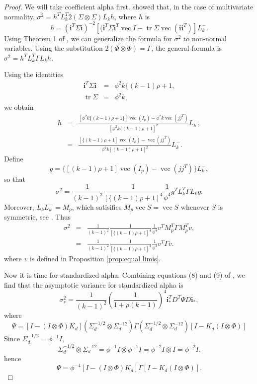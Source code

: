 \documentclass[twoside]{article}
\DeclareMathOperator{\tr}{tr}
\DeclareMathOperator{\vvec}{vec}
\begin{document}
\begin{proof}
We will take coefficient alpha first. \citet{Van_Zyl2000-si} showed that, in the case
of multivariate normality, $\sigma^{2}=h^{T}L_{k}^{T}2(\Sigma\otimes\Sigma)L_{k}h$,
where $h$ is \citep[eq. 19]{Van_Zyl2000-si}
\begin{equation*}
h = (\mathbf{i}^{T}\Sigma\mathbf{i})^{-2}[(\mathbf{i}^{T}\Sigma\mathbf{i}^{T}\vvec I-\tr\Sigma\vvec(\mathbf{i}\mathbf{i}^{T})]L_{k}^{-}.
\end{equation*}
Using Theorem 1 of \citet{Neudecker1990-ph}, we can generalize the formula for $\sigma^2$ to non-normal variables. Using the substitution
$2(\Phi\otimes\Phi)=\Gamma$, the general formula is $\sigma^{2}=h^{T}L_{k}^{T}\Gamma L_{k}h.$

Using the identities
\begin{eqnarray*}
\mathbf{i}^{T}\Sigma\mathbf{i} & = & \phi^{2}k\{(k-1)\rho+1,\\
\tr\Sigma & = & \phi^{2}k,
\end{eqnarray*}
we obtain
\begin{eqnarray*}
h & = & \frac{[\phi^{2}k\{(k-1)\rho+1\}]\vvec(I_{p})-\phi^{2}k\vvec(jj^{T})}{[\phi^{2}k\{(k-1)\rho+1]^{2}}L_{k}^{-},\\
 & = & \frac{[\{(k-1)\rho+1]\vvec(I_{p})-\vvec(jj^{T})}{\phi^{2}k[(k-1)\rho+1]^{2}}L_{k}^{-}.
\end{eqnarray*}
Define
\[
g=\{[(k-1)\rho+1]\vvec(I_{p})-\vvec(jj^{T})\}L_{k}^{-},
\]
so that
\[
\sigma^{2}=\frac{1}{(k-1)^{2}}\frac{1}{[\{(k-1)\rho+1]^{4}}\frac{1}{\phi^{4}}g^{T}L_{k}^{T}\Gamma L_{k}g.
\]
Moreover, $L_{k}L_{k}^{-}=M_{p}$, which satisifies $M_{p}\vvec S=\vvec S$
whenever $S$ is symmetric, see \citet[p. 275]{Van_Zyl2000-si}. Thus 
\begin{eqnarray*}
\sigma^{2} & = & \frac{1}{(k-1)^{2}}\frac{1}{[\{(k-1)\rho+1]^{4}}\frac{1}{\phi^{4}}v^{T}M_{p}^{T}\Gamma M_{p}^{T}v,\\
 & = & \frac{1}{(k-1)^{2}}\frac{1}{[\{(k-1)\rho+1]^{4}}\frac{1}{\phi^{4}}v^{T}\Gamma v.
\end{eqnarray*} where $v$ is defined in Proposition \ref{prop:equal limis}.

Now it is time for standardized alpha. Combining equations (8) and (9) of \citet{hayashi2005note},
we find that the asymptotic variance for standardized alpha is
\begin{equation*}
\sigma_{s}^{2}=\frac{1}{(k-1)^{2}}\left(\frac{1}{1+\rho(k-1)}\right)^{4}\mathbf{i}_{*}^{T}D^{T}\Psi D\mathbf{i}_{*},\label{eq:standardized alpha variance 3}
\end{equation*}
where 
\[
\Psi=[I-(I\otimes\Phi)K_{d}](\Sigma_{d}^{-1/2}\otimes\Sigma_{d}^{-12})\Gamma(\Sigma_{d}^{-1/2}\otimes\Sigma_{d}^{-12})[I-K_{d}(I\otimes\Phi)]
\]
Since $\Sigma_{d}^{-1/2}=\phi^{-1}I$,
\[
\Sigma_{d}^{-1/2}\otimes\Sigma_{d}^{-12}=\phi^{-1}I\otimes\phi^{-1}I=\phi^{-2}I\otimes I=\phi^{-2}I.
\]
hence 
\[
\Psi=\phi^{-4}[I-(I\otimes\Phi)K_{d}]\Gamma[I-K_{d}(I\otimes\Phi)].
\]
\end{proof}
\end{document}
